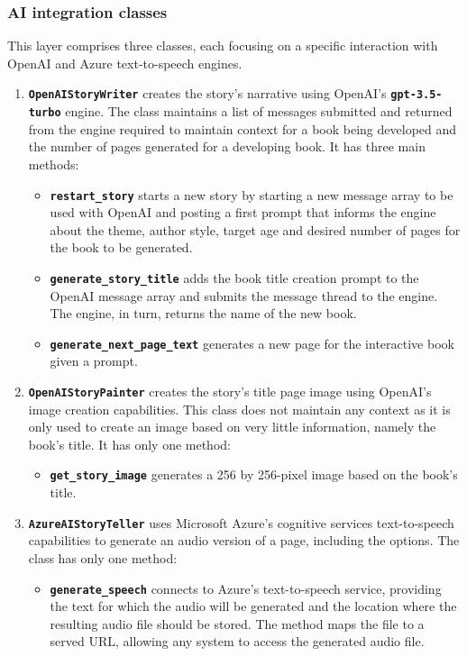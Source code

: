 \documentclass[conference]{IEEEtran}
\begin{document}
	\subsubsection{AI integration classes}
	
	This layer comprises three classes, each focusing on a specific interaction with OpenAI and Azure text-to-speech engines.
	
	\begin{enumerate}
		\item \textbf{\texttt{OpenAIStoryWriter}} creates the story's narrative using OpenAI's \textbf{\texttt{gpt-3.5-turbo}} engine. The class maintains a list of messages submitted and returned from the engine required to maintain context for a book being developed and the number of pages generated for a developing book. It has three main methods:
		\begin{itemize}
			\item\textbf{\texttt{restart\_story}} starts a new story by starting a new message array to be used with OpenAI and posting a first prompt that informs the engine about the theme, author style, target age and desired number of pages for the book to be generated.
			\item\textbf{\texttt{generate\_story\_title}} adds the book title creation prompt to the OpenAI message array and submits the message thread to the engine. The engine, in turn, returns the name of the new book.
			\item\textbf{\texttt{generate\_next\_page\_text}} generates a new page for the interactive book given a prompt.
		\end{itemize}
		\item\textbf{\texttt{OpenAIStoryPainter}} creates the story's title page image using OpenAI's image creation capabilities. This class does not maintain any context as it is only used to create an image based on very little information, namely the book's title. It has only one method:
		\begin{itemize}
			\item\textbf{\texttt{get\_story\_image}} generates a 256 by 256-pixel image based on the book's title.
		\end{itemize}
		\item\textbf{\texttt{AzureAIStoryTeller}} uses Microsoft Azure's cognitive services text-to-speech capabilities to generate an audio version of a page, including the options. The class has only one method:
		\begin{itemize}
			\item\textbf{\texttt{generate\_speech}} connects to Azure's text-to-speech service, providing the text for which the audio will be generated and the location where the resulting audio file should be stored. The method maps the file to a served URL, allowing any system to access the generated audio file.
		\end{itemize}
	\end{enumerate}
	
\end{document}
